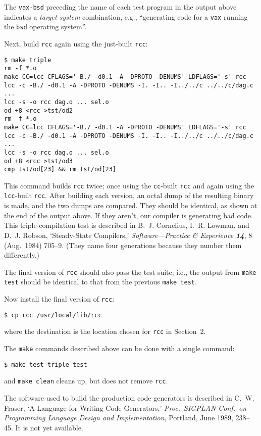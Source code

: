 The \verb|vax-bsd| preceding the name of each test program in the output
above indicates a {\it target\/\it-system\/} combination, e.g.,
``generating code for a \verb|vax| running the
\verb|bsd| operating system''.

Next, build \verb|rcc| again using the just-built \verb|rcc|:
\begin{verbatim}
$ make triple
rm -f *.o
make CC=lcc CFLAGS='-B./ -d0.1 -A -DPROTO -DENUMS' LDFLAGS='-s' rcc
lcc -c -B./ -d0.1 -A -DPROTO -DENUMS -I. -I.. -I../../c ../../c/dag.c
...
lcc -s -o rcc dag.o ... sel.o
od +8 <rcc >tst/od2
rm -f *.o
make CC=lcc CFLAGS='-B./ -d0.1 -A -DPROTO -DENUMS' LDFLAGS='-s' rcc
lcc -c -B./ -d0.1 -A -DPROTO -DENUMS -I. -I.. -I../../c ../../c/dag.c
...
lcc -s -o rcc dag.o ... sel.o
od +8 <rcc >tst/od3
cmp tst/od[23] && rm tst/od[23]
\end{verbatim}
This command builds \verb|rcc| twice; once using the
\verb|cc|-built \verb|rcc| and again using the \verb|lcc|-built \verb|rcc|.
After building each version, an octal dump of the resulting binary is made,
and the two dumps are compared. They should be identical, as shown
at the end of the output above.
If they aren't, our compiler is generating bad code.
This triple-compilation test is described in
B.~J. Cornelius, I.~R. Lowman, and D.~J. Robson,
`Steady-State Compilers,' {\it Software---Practice \& Experience \bf 14},
8 (Aug.\ 1984) 705--9. (They name four generations because they
number them differently.)

The final version of \verb|rcc| should also pass the test suite;
i.e., the output from \verb|make test|
should be identical to that from the previous \verb|make test|.

Now install the final version of \verb|rcc|:
\begin{verbatim}
$ cp rcc /usr/local/lib/rcc
\end{verbatim}
where the destination is the location chosen for \verb|rcc| in Section~2.

The \verb|make| commands described above can be done with a single command:
\begin{verbatim}
$ make test triple test
\end{verbatim}
and \verb|make clean| cleans up, but does not remove \verb|rcc|.

The software used to build the production code generators
is described in C.~W. Fraser, `A Language for Writing Code Generators,'
{\it Proc.\ SIGPLAN Conf.\ on Programming Language Design and Implementation},
Portland, June 1989, 238--45. It is not yet available.


